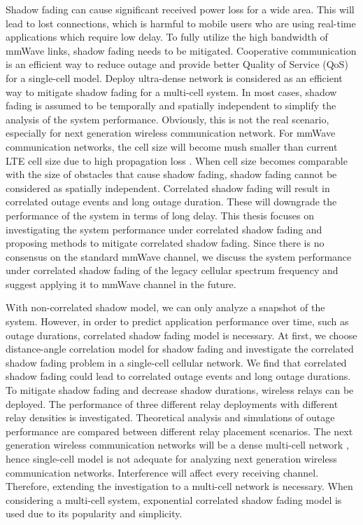 \par Shadow fading can cause significant received power loss for a wide area. This will lead to lost connections, which is harmful to mobile users who are using real-time applications which require low delay. To fully utilize the high bandwidth of mmWave links, shadow fading needs to be mitigated. Cooperative communication is an efficient way to reduce outage and provide better Quality of Service (QoS) for a single-cell model. Deploy ultra-dense network is considered as an efficient way to mitigate shadow fading for a multi-cell system. In most cases, shadow fading is assumed to be temporally and spatially independent to simplify the analysis of the system performance. Obviously, this is not the real scenario, especially for next generation wireless communication network. For mmWave communication networks, the cell size will become mush smaller than current LTE cell size due to high propagation loss \cite{rangan2014millimeter}. When cell size becomes comparable with the size of obstacles that cause shadow fading, shadow fading cannot be considered as spatially independent. Correlated shadow fading will result in correlated outage events and long outage duration. These will downgrade the performance of the system in terms of long delay. This thesis focuses on investigating the system performance under correlated shadow fading and proposing methods to mitigate correlated shadow fading. Since there is no consensus on the standard mmWave channel, we discuss the system performance under correlated shadow fading of the legacy cellular spectrum frequency and suggest applying it to mmWave channel in the future. 

\par With non-correlated shadow model, we can only analyze a snapshot of the system. However, in order to predict application performance over time, such as outage durations, correlated shadow fading model is necessary. At first, we choose distance-angle correlation model \cite{szyszkowicz2010feasibility} for shadow fading and investigate the correlated shadow fading problem in a single-cell cellular network. We find that correlated shadow fading could lead to correlated outage events and long outage durations.  To mitigate shadow fading and decrease shadow durations, wireless relays can be deployed. The performance of three different relay deployments with different relay densities is investigated. Theoretical analysis and simulations of outage performance are compared between different relay placement scenarios. The next generation wireless communication networks will be a dense multi-cell network \cite{rangan2014millimeter}, hence single-cell model is not adequate for analyzing next generation wireless communication networks. Interference will affect every receiving channel. Therefore, extending the investigation to a multi-cell network is necessary. When considering a multi-cell system, exponential correlated shadow fading model is used due to its popularity and simplicity. 

